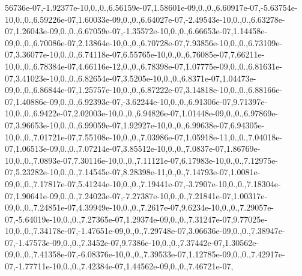 {56736e-\/07,-\/1.\-92377e-\/10,0.,0.,6.\-56159e-\/07,1.\-58601e-\/09,0.,0.,6.\-60917e-\/07,-\/5.\-63754e-\/10,0.,0.,6.\-59226e-\/07,1.\-60033e-\/09,0.,0.,6.\-64027e-\/07,-\/2.\-49543e-\/10,0.,0.,6.\-63278e-\/07,1.\-26043e-\/09,0.,0.,6.\-67059e-\/07,-\/1.\-35572e-\/10,0.,0.,6.\-66653e-\/07,1.\-14458e-\/09,0.,0.,6.\-70086e-\/07,2.\-13864e-\/10,0.,0.,6.\-70728e-\/07,7.\-93856e-\/10,0.,0.,6.\-73109e-\/07,3.\-36077e-\/10,0.,0.,6.\-74118e-\/07,6.\-55765e-\/10,0.,0.,6.\-76085e-\/07,7.\-66211e-\/10,0.,0.,6.\-78384e-\/07,4.\-66116e-\/12,0.,0.,6.\-78398e-\/07,1.\-07775e-\/09,0.,0.,6.\-81631e-\/07,3.\-41023e-\/10,0.,0.,6.\-82654e-\/07,3.\-5205e-\/10,0.,0.,6.\-8371e-\/07,1.\-04473e-\/09,0.,0.,6.\-86844e-\/07,1.\-25757e-\/10,0.,0.,6.\-87222e-\/07,3.\-14818e-\/10,0.,0.,6.\-88166e-\/07,1.\-40886e-\/09,0.,0.,6.\-92393e-\/07,-\/3.\-62244e-\/10,0.,0.,6.\-91306e-\/07,9.\-71397e-\/10,0.,0.,6.\-9422e-\/07,2.\-02003e-\/10,0.,0.,6.\-94826e-\/07,1.\-01448e-\/09,0.,0.,6.\-97869e-\/07,3.\-96653e-\/10,0.,0.,6.\-99059e-\/07,1.\-92927e-\/10,0.,0.,6.\-99638e-\/07,6.\-94305e-\/10,0.,0.,7.\-01721e-\/07,7.\-55108e-\/10,0.,0.,7.\-03986e-\/07,1.\-05918e-\/11,0.,0.,7.\-04018e-\/07,1.\-06513e-\/09,0.,0.,7.\-07214e-\/07,3.\-85512e-\/10,0.,0.,7.\-0837e-\/07,1.\-86769e-\/10,0.,0.,7.\-0893e-\/07,7.\-30116e-\/10,0.,0.,7.\-11121e-\/07,6.\-17983e-\/10,0.,0.,7.\-12975e-\/07,5.\-23282e-\/10,0.,0.,7.\-14545e-\/07,8.\-28398e-\/11,0.,0.,7.\-14793e-\/07,1.\-0081e-\/09,0.,0.,7.\-17817e-\/07,5.\-41244e-\/10,0.,0.,7.\-19441e-\/07,-\/3.\-7907e-\/10,0.,0.,7.\-18304e-\/07,1.\-90641e-\/09,0.,0.,7.\-24023e-\/07,-\/7.\-27387e-\/10,0.,0.,7.\-21841e-\/07,1.\-00317e-\/09,0.,0.,7.\-24851e-\/07,4.\-39949e-\/10,0.,0.,7.\-2617e-\/07,9.\-6234e-\/10,0.,0.,7.\-29057e-\/07,-\/5.\-64019e-\/10,0.,0.,7.\-27365e-\/07,1.\-29374e-\/09,0.,0.,7.\-31247e-\/07,9.\-77025e-\/10,0.,0.,7.\-34178e-\/07,-\/1.\-47651e-\/09,0.,0.,7.\-29748e-\/07,3.\-06636e-\/09,0.,0.,7.\-38947e-\/07,-\/1.\-47573e-\/09,0.,0.,7.\-3452e-\/07,9.\-7386e-\/10,0.,0.,7.\-37442e-\/07,1.\-30562e-\/09,0.,0.,7.\-41358e-\/07,-\/6.\-08376e-\/10,0.,0.,7.\-39533e-\/07,1.\-12785e-\/09,0.,0.,7.\-42917e-\/07,-\/1.\-77711e-\/10,0.,0.,7.\-42384e-\/07,1.\-44562e-\/09,0.,0.,7.\-46721e-\/07,}

